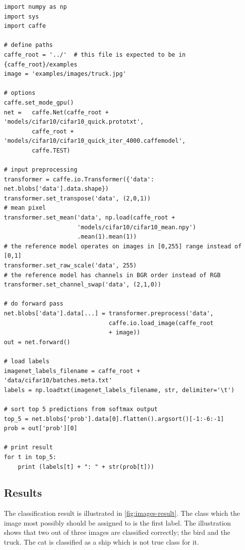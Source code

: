 \begin{lstlisting}[caption = The python script used for classification with the caffemodel from the original CNN., label={lst:script}]
import numpy as np
import sys
import caffe

# define paths
caffe_root = '../'  # this file is expected to be in {caffe_root}/examples
image = 'examples/images/truck.jpg'

# options
caffe.set_mode_gpu()
net =	caffe.Net(caffe_root + 'models/cifar10/cifar10_quick.prototxt',
        caffe_root + 'models/cifar10/cifar10_quick_iter_4000.caffemodel',
        caffe.TEST)

# input preprocessing
transformer = caffe.io.Transformer({'data': net.blobs['data'].data.shape})
transformer.set_transpose('data', (2,0,1))
# mean pixel
transformer.set_mean('data', np.load(caffe_root + 
					 'models/cifar10/cifar10_mean.npy')
					 .mean(1).mean(1)) 
# the reference model operates on images in [0,255] range instead of [0,1]
transformer.set_raw_scale('data', 255)
# the reference model has channels in BGR order instead of RGB  
transformer.set_channel_swap('data', (2,1,0))  

# do forward pass
net.blobs['data'].data[...] = transformer.preprocess('data', 
							  caffe.io.load_image(caffe_root 
							  + image))
out = net.forward()

# load labels
imagenet_labels_filename = caffe_root + 'data/cifar10/batches.meta.txt'
labels = np.loadtxt(imagenet_labels_filename, str, delimiter='\t')

# sort top 5 predictions from softmax output
top_5 = net.blobs['prob'].data[0].flatten().argsort()[-1:-6:-1]
prob = out['prob'][0]

# print result
for t in top_5:
    print (labels[t] + ": " + str(prob[t]))
\end{lstlisting}

\subsection{Results} %
\label{sub:results}

The classification result is illustrated in \autoref{fig:images-result}. The class which the image most possibly should be assigned to is the first label. The illustration shows that two out of three images are classified correctly; the bird and the truck. The cat is classified as a ship which is not true class for it.

